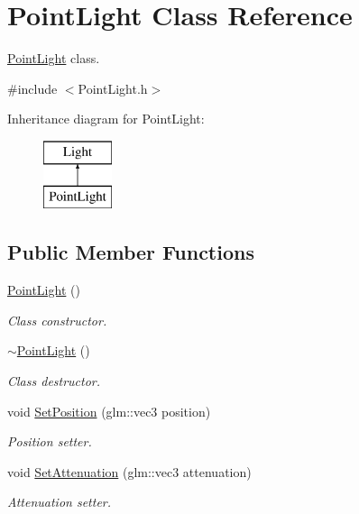 \hypertarget{class_point_light}{}\section{Point\+Light Class Reference}
\label{class_point_light}


\hyperlink{class_point_light}{Point\+Light} class.  




{\ttfamily \#include $<$Point\+Light.\+h$>$}

Inheritance diagram for Point\+Light\+:\begin{figure}[H]
\begin{center}
\leavevmode
\includegraphics[height=2.000000cm]{class_point_light}
\end{center}
\end{figure}
\subsection*{Public Member Functions}
\begin{DoxyCompactItemize}
\item 
\hyperlink{class_point_light_abbfdf5f05b559c49016f8bb97b0ca414}{Point\+Light} ()
\begin{DoxyCompactList}\small\item\em Class constructor. \end{DoxyCompactList}\item 
\hyperlink{class_point_light_aa12d9005d5372dbbe655a82231634341}{$\sim$\+Point\+Light} ()
\begin{DoxyCompactList}\small\item\em Class destructor. \end{DoxyCompactList}\item 
void \hyperlink{class_point_light_a54075ad125124b48c3ae0de94f8846ec}{Set\+Position} (glm\+::vec3 position)
\begin{DoxyCompactList}\small\item\em Position setter. \end{DoxyCompactList}\item 
void \hyperlink{class_point_light_a5dee3d9dfd33530fd0b5c4e3caa733a5}{Set\+Attenuation} (glm\+::vec3 attenuation)
\begin{DoxyCompactList}\small\item\em Attenuation setter. \end{DoxyCompactList}\end{DoxyCompactItemize}
